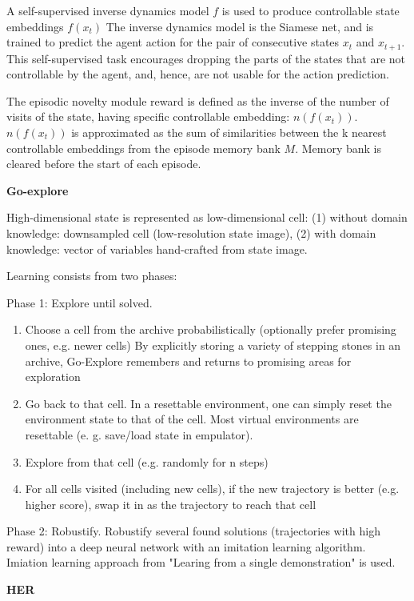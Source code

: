 \documentclass{article}
\begin{document}
A self-supervised inverse dynamics model $f$ is used to produce controllable state embeddings $f(x_t)$ The inverse dynamics model is the Siamese net, and is trained to predict the agent action for the pair of consecutive states $x_t$ and $x_{t+1}$. This self-supervised task encourages dropping the parts of the states that are not controllable by the agent, and, hence, are not usable for the action prediction.

The episodic novelty module reward is defined as the inverse of the number of visits of the state, having specific controllable embedding: $n(f(x_t))$. $n(f(x_t))$ is approximated as the sum of similarities between the k nearest controllable embeddings from the episode memory bank $M$. Memory bank is cleared before the start of each episode.

\textbf{Go-explore}~\citep{Ecoffet2019GoExploreAN}

High-dimensional state is represented as low-dimensional cell: (1) without domain knowledge: downsampled cell (low-resolution state image), (2) with domain knowledge: vector of variables hand-crafted from state image.

Learning consists from two phases:

Phase 1: Explore until solved.
\begin{enumerate}
  \item Choose a cell from the archive probabilistically (optionally prefer promising ones, e.g. newer cells)
By explicitly storing a variety of stepping stones in an archive, Go-Explore remembers and returns to promising areas for exploration
  \item Go back to that cell. In a resettable environment, one can simply reset the environment state to that of the cell. Most virtual environments are resettable (e. g. save/load state in empulator).
  \item Explore from that cell (e.g. randomly for n steps)
  \item For all cells visited (including new cells), if the new trajectory is better (e.g. higher score), swap it in as the trajectory to reach that cell
\end{enumerate}

Phase 2: Robustify. Robustify several found solutions (trajectories with high reward) into a deep neural network with an imitation learning algorithm. Imiation learning approach from "Learing from a single demonstration" is used.

\textbf{HER}~\citep{Andrychowicz2017HindsightER}
\end{document}
